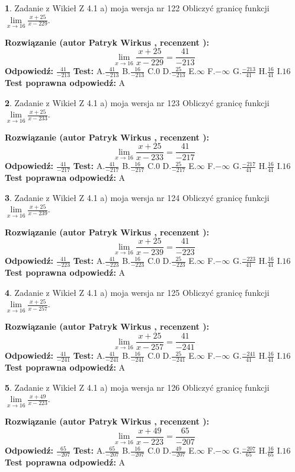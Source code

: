 \documentclass[12pt, a4paper]{article}
\theoremstyle{definition} %
\newtheorem{zad}{}
\newcommand{\zadStart}[1]{\begin{zad}#1\newline}
\newcommand{\zadStop}{\end{zad}}
\newcommand{\rozwStart}[2]{\noindent \textbf{Rozwiązanie (autor #1 , recenzent #2): }\newline}
\newcommand{\rozwStop}{\newline}
\newcommand{\odpStart}{\noindent \textbf{Odpowiedź:}\newline}
\newcommand{\odpStop}{\newline}
\newcommand{\testStart}{\noindent \textbf{Test:}\newline}
\newcommand{\testStop}{\newline}
\newcommand{\kluczStart}{\noindent \textbf{Test poprawna odpowiedź:}\newline}
\newcommand{\kluczStop}{\newline}
\begin{document}
\zadStart{Zadanie z Wikieł Z 4.1 a) moja wersja nr 122}
Obliczyć granicę funkcji $\lim\limits_{x\to16}\frac{x+25}{x-229}$.
\zadStop
\rozwStart{Patryk Wirkus}{}
$$\lim\limits_{x\to16}\frac{x+25}{x-229} = \frac{41}{-213}$$
\rozwStop
\odpStart
$\frac{41}{-213}$
\odpStop
\testStart
A.$\frac{41}{-213}$
B.$\frac{16}{-213}$
C.$0$
D.$\frac{25}{-213}$
E.$\infty$
F.$-\infty$
G.$\frac{-213}{41}$
H.$\frac{16}{41}$
I.$16$
\testStop
\kluczStart
A
\kluczStop



\zadStart{Zadanie z Wikieł Z 4.1 a) moja wersja nr 123}
Obliczyć granicę funkcji $\lim\limits_{x\to16}\frac{x+25}{x-233}$.
\zadStop
\rozwStart{Patryk Wirkus}{}
$$\lim\limits_{x\to16}\frac{x+25}{x-233} = \frac{41}{-217}$$
\rozwStop
\odpStart
$\frac{41}{-217}$
\odpStop
\testStart
A.$\frac{41}{-217}$
B.$\frac{16}{-217}$
C.$0$
D.$\frac{25}{-217}$
E.$\infty$
F.$-\infty$
G.$\frac{-217}{41}$
H.$\frac{16}{41}$
I.$16$
\testStop
\kluczStart
A
\kluczStop



\zadStart{Zadanie z Wikieł Z 4.1 a) moja wersja nr 124}
Obliczyć granicę funkcji $\lim\limits_{x\to16}\frac{x+25}{x-239}$.
\zadStop
\rozwStart{Patryk Wirkus}{}
$$\lim\limits_{x\to16}\frac{x+25}{x-239} = \frac{41}{-223}$$
\rozwStop
\odpStart
$\frac{41}{-223}$
\odpStop
\testStart
A.$\frac{41}{-223}$
B.$\frac{16}{-223}$
C.$0$
D.$\frac{25}{-223}$
E.$\infty$
F.$-\infty$
G.$\frac{-223}{41}$
H.$\frac{16}{41}$
I.$16$
\testStop
\kluczStart
A
\kluczStop



\zadStart{Zadanie z Wikieł Z 4.1 a) moja wersja nr 125}
Obliczyć granicę funkcji $\lim\limits_{x\to16}\frac{x+25}{x-257}$.
\zadStop
\rozwStart{Patryk Wirkus}{}
$$\lim\limits_{x\to16}\frac{x+25}{x-257} = \frac{41}{-241}$$
\rozwStop
\odpStart
$\frac{41}{-241}$
\odpStop
\testStart
A.$\frac{41}{-241}$
B.$\frac{16}{-241}$
C.$0$
D.$\frac{25}{-241}$
E.$\infty$
F.$-\infty$
G.$\frac{-241}{41}$
H.$\frac{16}{41}$
I.$16$
\testStop
\kluczStart
A
\kluczStop



\zadStart{Zadanie z Wikieł Z 4.1 a) moja wersja nr 126}
Obliczyć granicę funkcji $\lim\limits_{x\to16}\frac{x+49}{x-223}$.
\zadStop
\rozwStart{Patryk Wirkus}{}
$$\lim\limits_{x\to16}\frac{x+49}{x-223} = \frac{65}{-207}$$
\rozwStop
\odpStart
$\frac{65}{-207}$
\odpStop
\testStart
A.$\frac{65}{-207}$
B.$\frac{16}{-207}$
C.$0$
D.$\frac{49}{-207}$
E.$\infty$
F.$-\infty$
G.$\frac{-207}{65}$
H.$\frac{16}{65}$
I.$16$
\testStop
\kluczStart
A
\kluczStop
\end{document}
